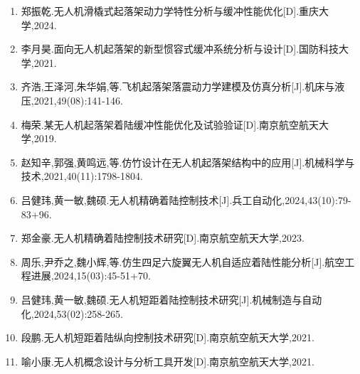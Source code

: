 \begin{enumerate}
\item \hypertarget{ref:12}{}郑振乾.无人机滑橇式起落架动力学特性分析与缓冲性能优化[D].重庆大学,2024.
\item \hypertarget{ref:13}{}李月昊.面向无人机起落架的新型惯容式缓冲系统分析与设计[D].国防科技大学,2021.
\item \hypertarget{ref:14}{}齐浩,王泽河,朱华娟,等.飞机起落架落震动力学建模及仿真分析[J].机床与液压,2021,49(08):141-146.
\item \hypertarget{ref:15}{}梅荣.某无人机起落架着陆缓冲性能优化及试验验证[D].南京航空航天大学,2019.
\item \hypertarget{ref:16}{}赵知辛,郭强,黄鸣远,等.仿竹设计在无人机起落架结构中的应用[J].机械科学与技术,2021,40(11):1798-1804.
\item \hypertarget{ref:17}{}吕健玮,黄一敏,魏硕.无人机精确着陆控制技术[J].兵工自动化,2024,43(10):79-83+96.
\item \hypertarget{ref:18}{}郑金豪.无人机精确着陆控制技术研究[D].南京航空航天大学,2023.
\item \hypertarget{ref:19}{}周乐,尹乔之,魏小辉,等.仿生四足六旋翼无人机自适应着陆性能分析[J].航空工程进展,2024,15(03):45-51+70.
\item \hypertarget{ref:20}{}吕健玮,黄一敏,魏硕.无人机短距着陆控制技术研究[J].机械制造与自动化,2024,53(02):258-265.
\item \hypertarget{ref:21}{}段鹏.无人机短距着陆纵向控制技术研究[D].南京航空航天大学,2021.
\item \hypertarget{ref:22}{}喻小康.无人机概念设计与分析工具开发[D].南京航空航天大学,2021.
\end{enumerate}
\endgroup
